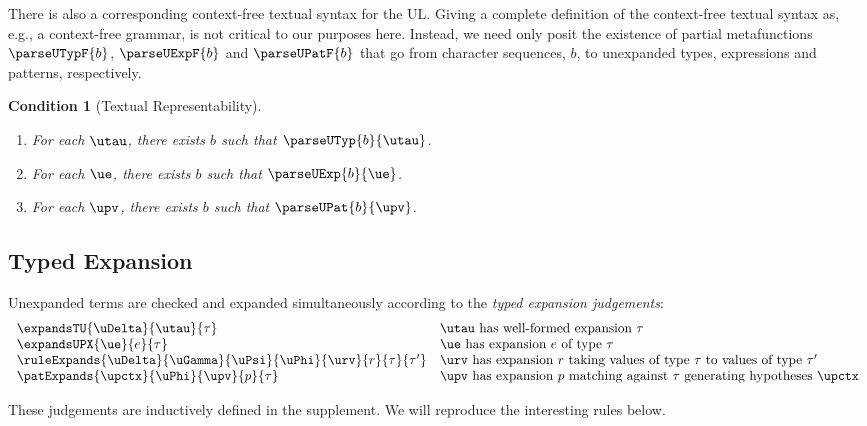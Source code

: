 \documentclass[acmlarge,review,anonymous]{acmart}\settopmatter{printfolios=true}
\newtheorem{condition}[theorem]{Condition}
\begin{document}
There is also a corresponding context-free textual syntax for the UL. 
Giving a complete definition of the context-free textual syntax as, e.g., a context-free grammar, is not critical to our purposes here. 
Instead, we need only posit the existence of partial metafunctions $\parseUTypF{b}$, $\parseUExpF{b}$ and $\parseUPatF{b}$  that go from character sequences, $b$, to unexpanded types, expressions and patterns, respectively. 
\begin{condition}[Textual Representability] ~
\begin{enumerate}[nolistsep]
\item For each $\utau$, there exists $b$ such that $\parseUTyp{b}{\utau}$. 
\item For each $\ue$, there exists $b$ such that $\parseUExp{b}{\ue}$.
\item For each $\upv$, there exists $b$ such that $\parseUPat{b}{\upv}$.
\end{enumerate}
\end{condition}

\subsection{Typed Expansion}\label{sec:typed-expansion-U}
Unexpanded terms are checked and expanded simultaneously according to the \emph{typed expansion judgements}:
\[\begin{array}{ll}
\expandsTU{\uDelta}{\utau}{\tau} & \text{$\utau$ has well-formed expansion $\tau$}\\
\expandsUPX{\ue}{e}{\tau} & \text{$\ue$ has expansion $e$ of type $\tau$}\\
\ruleExpands{\uDelta}{\uGamma}{\uPsi}{\uPhi}{\urv}{r}{\tau}{\tau'} & \text{$\urv$ has expansion $r$ taking values of type $\tau$ to values of type $\tau'$}\\
\patExpands{\upctx}{\uPhi}{\upv}{p}{\tau} & \text{$\upv$ has expansion $p$ matching against $\tau$ generating hypotheses $\upctx$}
\end{array}\]

These judgements are inductively defined in the supplement. We will reproduce the interesting rules below.
\end{document}
